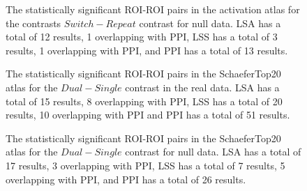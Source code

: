 \documentclass[phd,appendix,figures]{uithesis}
\begin{document}
\begin{figure}[H]
  \ContinuedFloat
  \centering


  \caption[All contrasts for all atlases for all data for LSA/LSS versus PPI continued...]{
      The statistically significant ROI-ROI pairs in the activation atlas
      for the contrasts $Switch - Repeat$ contrast for null data.
      LSA has a total of 12 results, 1 overlapping with PPI,
      LSS has a total of 3 results, 1 overlapping with PPI,
      and PPI has a total of 13 results.
  }
  \label{fig:data-null_type-brain_atlas-activation_contrast-switchxrepeat}
\end{figure}
\begin{figure}[H]
  \centering


  \caption[All contrasts for all atlases for all data for LSA/LSS versus PPI continued...]{
      The statistically significant ROI-ROI pairs in the SchaeferTop20 atlas
      for the $Dual - Single$ contrast in the real data.
      LSA has a total of 15 results, 8 overlapping with PPI,
      LSS has a total of 20 results, 10 overlapping with PPI and
      PPI has a total of 51 results.
  }
  \label{fig:data-real_type-brain_atlas-schaeferbest_contrast-dualxsingle}
\end{figure}

\begin{figure}[H]
  \ContinuedFloat
  \centering


  \caption[All contrasts for all atlases for all data for LSA/LSS versus PPI continued...]{
      The statistically significant ROI-ROI pairs in the SchaeferTop20 atlas
      for the $Dual - Single$ contrast for null data.
      LSA has a total of 17 results, 3 overlapping with PPI,
      LSS has a total of 7 results, 5 overlapping with PPI,
      and PPI has a total of 26 results.
  }
  \label{fig:data-null_type-brain_atlas-schaeferbest_contrast-dualxsingle}
\end{figure}
\end{document}

